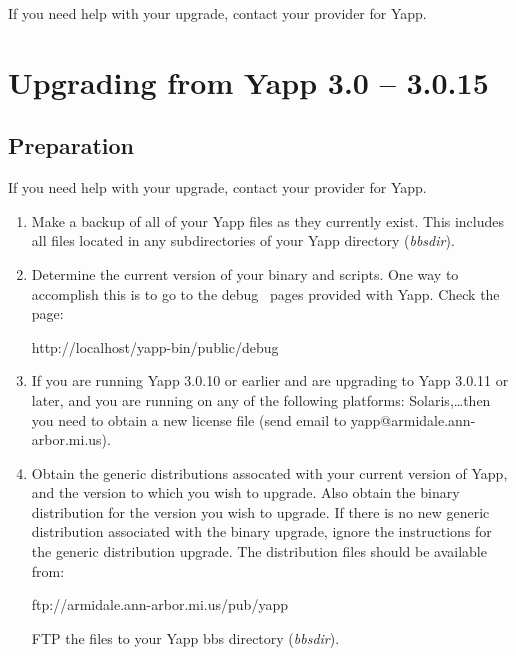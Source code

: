 \documentclass[twoside]{report}
\begin{document}
   If you need help with your upgrade, contact your provider for Yapp.

\section{Upgrading from Yapp 3.0 -- 3.0.15}
   \subsection{Preparation}
      If you need help with your upgrade, contact your provider for Yapp.
   
      \begin{enumerate}
   
         \item Make a backup of all of your Yapp files as they currently exist.
               This includes all files located in any subdirectories of your 
               Yapp directory ({\em bbsdir}).
   
         \item Determine the current version of your binary and scripts.
               One way to accomplish this is to go to the debug~ 
               pages provided with Yapp. Check the page:
      
               http://localhost/yapp-bin/public/debug
   
         \item If you are running Yapp 3.0.10 or earlier and are upgrading to 
               Yapp 3.0.11 or later, and you are running on any of the following
               platforms: Solaris,\dots  then you need to obtain a new license
               file (send email to yapp@armidale.ann-arbor.mi.us).
   
         \item Obtain the generic distributions assocated with your current 
               version of Yapp, and the version to which you wish to upgrade. 
               Also obtain the binary distribution for the version you wish to 
               upgrade.  If there is no new generic distribution associated with 
               the binary upgrade, ignore the instructions for the generic 
               distribution upgrade.  The distribution files should be 
               available from:
   
               {\centering ftp://armidale.ann-arbor.mi.us/pub/yapp}
   
               FTP the files to your Yapp bbs directory ({\em bbsdir}).
      \end{enumerate}
   
\end{document}
